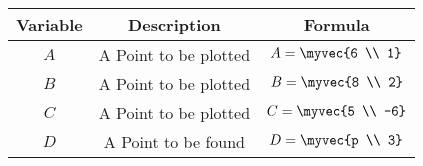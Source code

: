 \begin{center}
    \begin{tabular}{|c|c|c|} 
        \hline
            \textbf{Variable} & \textbf{Description} & \textbf{Formula} \\ 
        \hline
            $A$   & A Point to be plotted & $A = \myvec{6 \\ 1}$ \\ 
        \hline
            $B$   &  A Point to be plotted &  $B = \myvec{8 \\ 2}$\\ 
        \hline
            $C$   & A Point to be plotted & $C = \myvec{5 \\ -6}$ \\ 
        \hline
        $D$   & A Point to be found & $D = \myvec{p \\ 3}$ \\ 
        \hline
         \end{tabular}
\end{center}  
